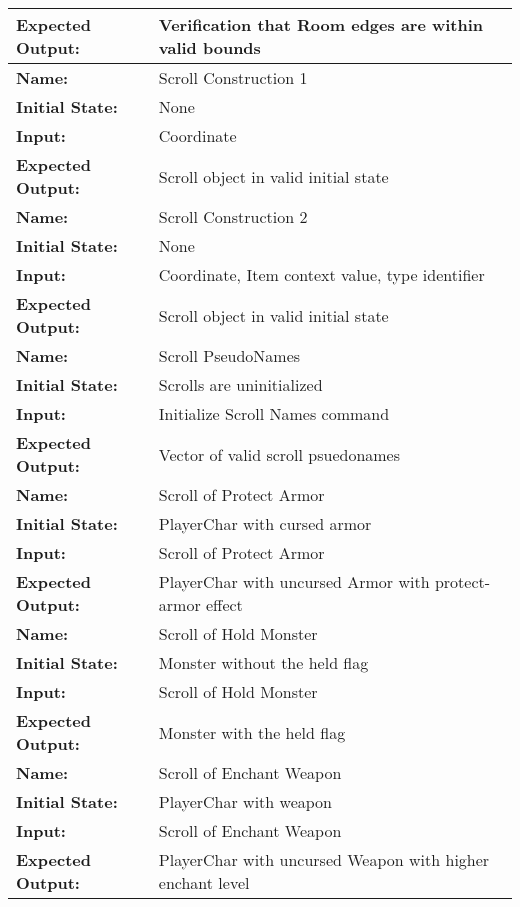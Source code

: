 \documentclass[12pt, titlepage]{article}
\begin{document}
\begin{center}
\begin{longtable}{ l | p{10cm} }
				\textbf{Expected Output:} & Verification that Room edges are within valid bounds\\[0.6em]
				\hline
				\rule{0pt}{1.5em}\textbf{Name:} & Scroll Construction 1\\
				\textbf{Initial State:} & None\\
				\textbf{Input:} & Coordinate\\
				\textbf{Expected Output:} & Scroll object in valid initial state\\[0.6em]
				\hline
				\rule{0pt}{1.5em}\textbf{Name:} & Scroll Construction 2\\
				\textbf{Initial State:} & None\\
				\textbf{Input:} & Coordinate, Item context value, type identifier\\
				\textbf{Expected Output:} & Scroll object in valid initial state\\[0.6em]
				\hline
				\rule{0pt}{1.5em}\textbf{Name:} & Scroll PseudoNames\\
				\textbf{Initial State:} & Scrolls are uninitialized\\
				\textbf{Input:} & Initialize Scroll Names command\\
				\textbf{Expected Output:} & Vector of valid scroll psuedonames\\[0.6em]
				\hline
				\rule{0pt}{1.5em}\textbf{Name:} & Scroll of Protect Armor\\
				\textbf{Initial State:} & PlayerChar with cursed armor \\
				\textbf{Input:} & Scroll of Protect Armor\\
				\textbf{Expected Output:} & PlayerChar with uncursed Armor with protect-armor effect\\[0.6em]
				\hline
				\rule{0pt}{1.5em}\textbf{Name:} & Scroll of Hold Monster\\
				\textbf{Initial State:} & Monster without the held flag\\
				\textbf{Input:} & Scroll of Hold Monster\\
				\textbf{Expected Output:} & Monster with the held flag\\[0.6em]
				\hline
				\rule{0pt}{1.5em}\textbf{Name:} & Scroll of Enchant Weapon\\
				\textbf{Initial State:} & PlayerChar with weapon\\
				\textbf{Input:} & Scroll of Enchant Weapon\\
				\textbf{Expected Output:} & PlayerChar with uncursed Weapon with higher enchant level\\[0.6em]

\end{longtable}
\end{center}
\end{document}
